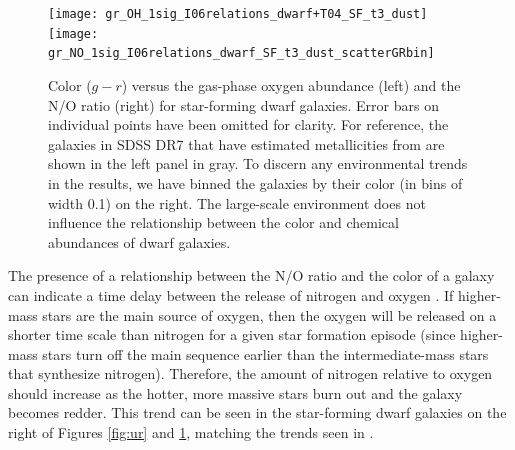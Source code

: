 \begin{figure}
    \centering
    \texttt{[image: gr\_OH\_1sig\_I06relations\_dwarf+T04\_SF\_t3\_dust]}
    \texttt{[image: gr\_NO\_1sig\_I06relations\_dwarf\_SF\_t3\_dust\_scatterGRbin]}
    \caption{Color ($g-r$) versus the gas-phase oxygen abundance (left) and the 
    N/O ratio (right) for star-forming dwarf galaxies.  Error bars on individual 
    points have been omitted for clarity.  For reference, the galaxies in SDSS 
    DR7 that have estimated metallicities from \cite{Tremonti04} are shown in 
    the left panel in gray.  To discern any environmental trends in the results, 
    we have binned the galaxies by their color (in bins of width 0.1) on the 
    right.  The large-scale environment does not influence the relationship 
    between the color and chemical abundances of dwarf galaxies.}
    \label{fig:gr}
\end{figure}

The presence of a relationship between the N/O ratio and the color of a galaxy 
can indicate a time delay between the release of nitrogen and oxygen 
\citep{vanZee06a,Berg12}.  If higher-mass stars are the main source of oxygen, 
then the oxygen will be released on a shorter time scale than nitrogen for a 
given star formation episode (since higher-mass stars turn off the main sequence 
earlier than the intermediate-mass stars that synthesize nitrogen).  Therefore, 
the amount of nitrogen relative to oxygen should increase as the hotter, more 
massive stars burn out and the galaxy becomes redder.  This trend can be seen in 
the star-forming dwarf galaxies on the right of Figures \ref{fig:ur} and 
\ref{fig:gr}, matching the trends seen in \cite{Douglass17b,vanZee06a,Berg12}.

